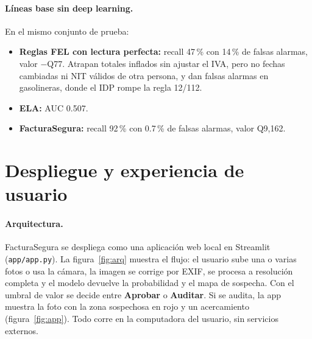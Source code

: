 \documentclass[11pt,letterpaper]{article}
\begin{document}
\paragraph{Líneas base sin deep learning.} En el mismo conjunto de prueba:
\begin{itemize}
  \item \textbf{Reglas FEL con lectura perfecta:} recall 47\,\% con 14\,\% de falsas alarmas, valor $-$Q77. Atrapan totales inflados sin ajustar el IVA, pero no fechas cambiadas ni NIT válidos de otra persona, y dan falsas alarmas en gasolineras, donde el IDP rompe la regla 12/112.
  \item \textbf{ELA:} AUC 0.507.
  \item \textbf{FacturaSegura:} recall 92\,\% con 0.7\,\% de falsas alarmas, valor Q9,162.
\end{itemize}

\section{Despliegue y experiencia de usuario}

\paragraph{Arquitectura.} FacturaSegura se despliega como una aplicación web local en Streamlit (\texttt{app/app.py}). La figura~\ref{fig:arq} muestra el flujo: el usuario sube una o varias fotos o usa la cámara, la imagen se corrige por EXIF, se procesa a resolución completa y el modelo devuelve la probabilidad y el mapa de sospecha. Con el umbral de valor se decide entre \textbf{Aprobar} o \textbf{Auditar}. Si se audita, la app muestra la foto con la zona sospechosa en rojo y un acercamiento (figura~\ref{fig:app}). Todo corre en la computadora del usuario, sin servicios externos.
\end{document}
